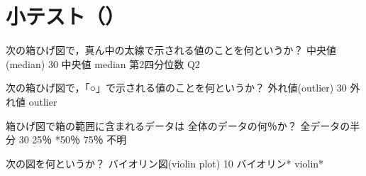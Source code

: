 \newcommand{\Release}{}
\newcommand{\Slide}{}
\newcommand{\PrintLecture}{1}
\newcommand{\PrintSolution}{1}







\maketitle

\section{小テスト（\MyClass）}

\begin{quiz}{\MyClass}

\QuizShortAnswer
{
  次の箱ひげ図で，真ん中の太線で示される値のことを何というか？
}
{
  中央値(median)
}
{30}
{中央値}
{median}
{第2四分位数}
{Q2}

\QuizShortAnswer
{
  次の箱ひげ図で，「○」で示される値のことを何というか？
}
{
  外れ値(outlier)
}
{30}
{外れ値}
{outlier}
{}
{}

\QuizMultipleChoices
{
  箱ひげ図で箱の範囲に含まれるデータは
  全体のデータの何％か？
}
{
  全データの半分
}
{30}
{25％}
{*50％}
{75％}
{不明}

\QuizShortAnswer
{
  次の図を何というか？
}
{
  バイオリン図(violin plot)
}
{10}
{バイオリン*}
{violin*}
{}
{}

\end{quiz}


